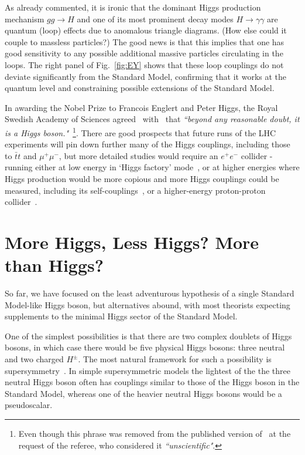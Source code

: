 \documentclass[12pt]{article}
\numberwithin{equation}{section}
\begin{document}
As already commented, it is ironic that the dominant Higgs production mechanism $gg \to H$
and one of its most prominent decay modes $H \to \gamma \gamma$ are quantum (loop) effects
due to anomalous triangle diagrams. (How else could it couple to massless particles?) The good news
is that this implies that one has good sensitivity to any possible additional massive particles
circulating in the loops. The right panel of Fig.~\ref{fig:EY} shows that these loop couplings
do not deviate significantly from the Standard Model, confirming that it works at the quantum level and
constraining possible extensions of the Standard Model.

In awarding the Nobel Prize to Francois Englert and Peter Higgs, the Royal Swedish Academy of Sciences
agreed~\cite{Nobel} with~\cite{EY3} that {\it ``beyond any reasonable doubt, it is a Higgs boson."}~\footnote{Even though this phrase was removed 
from the published version of~\cite{EY3} at the request of the referee, who considered it {\it ``unscientific"}.}. There are good
prospects that future runs of the LHC experiments will pin down further many of the Higgs couplings, 
including those to ${\bar t} t$ and $\mu^+ \mu^-$, but more detailed studies would require an $e^+ e^-$ collider -
running either at low energy in `Higgs factory' mode~\cite{ILC,TLEP},
or at higher energies where Higgs production would be more copious and more
Higgs couplings could be measured, including its self-couplings~\cite{CLIC}, or a higher-energy proton-proton collider~\cite{FCC-hh}.

\section{More Higgs, Less Higgs? More than Higgs?}

So far, we have focused on the least adventurous hypothesis of
a single Standard Model-like Higgs boson, but alternatives abound,
with most theorists expecting supplements to the minimal Higgs sector
of the Standard Model.

One of the simplest possibilities is that there are two complex doublets
of Higgs bosons, in which case there would be five physical Higgs bosons:
three neutral and two charged $H^\pm$. The most natural framework for such a possibility
is supersymmetry~\cite{susy}. In simple supersymmetric models the lightest of the the three neutral
Higgs boson often has couplings similar to those of the
Higgs boson in the Standard Model, whereas one of the heavier neutral
Higgs bosons would be a pseudoscalar.
\end{document}
